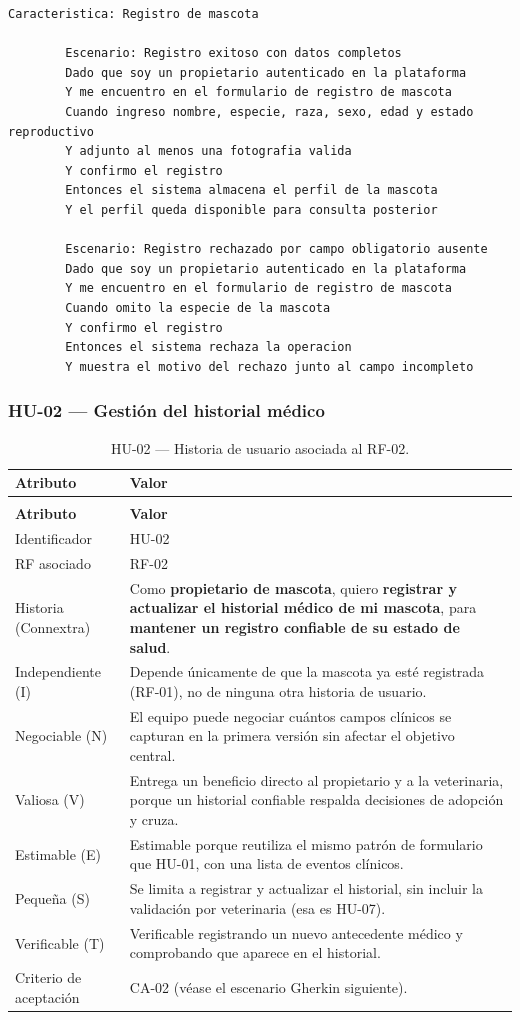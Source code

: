 \documentclass[journal,onecolumn]{IEEEtran}
\makeatletter
\newenvironment{atributos}[2]{%
	\small
	\begin{longtable}{@{}>{\raggedright\arraybackslash}p{4.2cm} >{\raggedright\arraybackslash}p{11.2cm}@{}}
		\caption{#2}\label{tab:#1}\\
		\toprule
		\textbf{Atributo} & \textbf{Valor} \\
		\midrule
		\endfirsthead
		\multicolumn{2}{@{}l}{\small\itshape (continuación)}\\
		\toprule
		\textbf{Atributo} & \textbf{Valor} \\
		\midrule
		\endhead
		\bottomrule
		\endlastfoot
	}{%
	\end{longtable}
	\normalsize
}
\makeatother
\begin{document}
	\begin{lstlisting}[style=gherkin,caption={CA-01 --- Escenario de aceptación de la historia HU-01.},label={lst:ca01}]
		Caracteristica: Registro de mascota
		
		Escenario: Registro exitoso con datos completos
		Dado que soy un propietario autenticado en la plataforma
		Y me encuentro en el formulario de registro de mascota
		Cuando ingreso nombre, especie, raza, sexo, edad y estado reproductivo
		Y adjunto al menos una fotografia valida
		Y confirmo el registro
		Entonces el sistema almacena el perfil de la mascota
		Y el perfil queda disponible para consulta posterior
		
		Escenario: Registro rechazado por campo obligatorio ausente
		Dado que soy un propietario autenticado en la plataforma
		Y me encuentro en el formulario de registro de mascota
		Cuando omito la especie de la mascota
		Y confirmo el registro
		Entonces el sistema rechaza la operacion
		Y muestra el motivo del rechazo junto al campo incompleto
	\end{lstlisting}
	
	\subsubsection{HU-02 --- Gestión del historial médico}
	
	\begin{atributos}{HU-02}{HU-02 --- Historia de usuario asociada al RF-02.}
		Identificador & HU-02 \\
		RF asociado & RF-02 \\
		Historia (Connextra) & Como \textbf{propietario de mascota}, quiero \textbf{registrar y actualizar el historial médico de mi mascota}, para \textbf{mantener un registro confiable de su estado de salud}. \\
		Independiente (I) & Depende únicamente de que la mascota ya esté registrada (RF-01), no de ninguna otra historia de usuario. \\
		Negociable (N) & El equipo puede negociar cuántos campos clínicos se capturan en la primera versión sin afectar el objetivo central. \\
		Valiosa (V) & Entrega un beneficio directo al propietario y a la veterinaria, porque un historial confiable respalda decisiones de adopción y cruza. \\
		Estimable (E) & Estimable porque reutiliza el mismo patrón de formulario que HU-01, con una lista de eventos clínicos. \\
		Pequeña (S) & Se limita a registrar y actualizar el historial, sin incluir la validación por veterinaria (esa es HU-07). \\
		Verificable (T) & Verificable registrando un nuevo antecedente médico y comprobando que aparece en el historial. \\
		Criterio de aceptación & CA-02 (véase el escenario Gherkin siguiente). \\
	\end{atributos}
	
\end{document}
